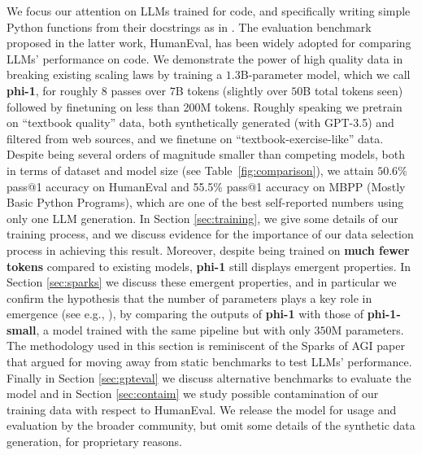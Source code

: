 We focus our attention on LLMs trained for code, and specifically writing simple Python functions from their docstrings as in \cite{humaneval}. The evaluation benchmark proposed in the latter work, HumanEval, has been widely adopted for comparing LLMs' performance on code. We demonstrate the power of high quality data in breaking existing scaling laws by training a $1.3$B-parameter model, which we call \textbf{phi-1}, for roughly $8$ passes over $7$B tokens (slightly over $50$B total tokens seen) followed by finetuning on less than 200M tokens. Roughly speaking we pretrain on ``textbook quality'' data, both synthetically generated (with GPT-3.5) and filtered from web sources, and we finetune on ``textbook-exercise-like'' data. Despite being several orders of magnitude smaller than competing models, both in terms of dataset and model size (see Table~\ref{fig:comparison}), we attain $50.6\%$ pass@1 accuracy on HumanEval and 55.5\% pass@1 accuracy on MBPP (Mostly Basic Python Programs), which are one of the best self-reported numbers using only one LLM generation. In Section \ref{sec:training}, we give some details of our training process, and we discuss evidence for the importance of our data selection process in achieving this result. Moreover, despite being trained on \textbf{much fewer tokens} compared to existing models, \textbf{phi-1} still displays emergent properties. In Section \ref{sec:sparks} we discuss these emergent properties, and in particular we confirm the hypothesis that the number of parameters plays a key role in emergence (see e.g., \cite{stack2022emergent}), by comparing the outputs of \textbf{phi-1} with those of \textbf{phi-1-small}, a model trained with the same pipeline but with only $350$M parameters. The methodology used in this section is reminiscent of the Sparks of AGI paper \cite{sparks} that argued for moving away from static benchmarks to test LLMs' performance. Finally in Section \ref{sec:gpteval} we discuss alternative benchmarks to evaluate the model and in Section \ref{sec:contaim} we study possible contamination of our training data with respect to HumanEval. We release the model for usage and evaluation by the broader community, but omit some details of the synthetic data generation, for proprietary reasons. %

